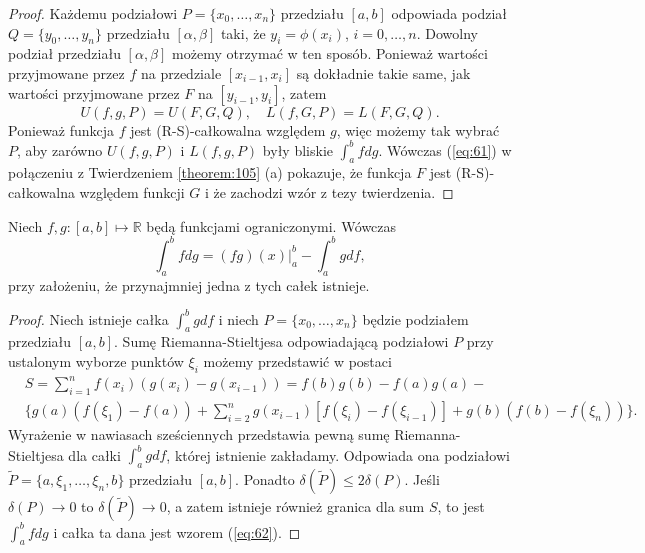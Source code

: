 \documentclass[leqno]{article}
\begin{document}
\begin{justify}
\begin{proof}
    Każdemu podziałowi $P = \{x_0, \ldots, x_n \}$ przedziału $[a,b]$ odpowiada podział 
    $Q = \{y_0, \ldots, y_n \}$ przedziału $[\alpha, \beta]$ taki, że $y_i = \phi(x_i)$, $i = 0, \ldots, n$.
    Dowolny podział przedziału $[\alpha, \beta]$ możemy otrzymać w ten sposób. Ponieważ wartości przyjmowane przez $f$ na przedziale $[x_{i-1}, x_i]$ są dokładnie takie same,
    jak wartości przyjmowane przez $F$ na $[y_{i-1}, y_i]$, zatem
    \begin{equation}\label{eq:61}
        U(f, g, P) = U(F, G, Q), \quad L(f, G, P) = L(F, G, Q).
    \end{equation}
    Ponieważ funkcja $f$ jest (R-S)-całkowalna względem $g$, więc możemy tak wybrać $P$, aby
    zarówno $U(f, g, P)$ i $L(f, g, P)$ były bliskie $\int_{a}^{b}fdg$. Wówczas (\ref{eq:61}) w
    połączeniu z Twierdzeniem \ref{theorem:105} (a) pokazuje, że funkcja $F$ jest (R-S)-całkowalna
    względem funkcji $G$ i że zachodzi wzór z tezy twierdzenia.
\end{proof}

\begin{theorem}
{
    Niech $f, g : [a,b] \mapsto \mathbb{R}$ będą funkcjami ograniczonymi. Wówczas 
    \begin{equation}\label{eq:62}
        \int_{a}^{b}fdg = (fg)(x) \big|_a^b - \int_{a}^{b}gdf,
    \end{equation}
    przy założeniu, że przynajmniej jedna z tych całek istnieje.
}
\end{theorem}

\begin{proof}
    Niech istnieje całka $\int_{a}^{b}gdf$ i niech $P = \{x_0, \ldots, x_n\}$ będzie podziałem przedziału $[a,b]$.
    Sumę Riemanna-Stieltjesa odpowiadającą podziałowi $P$ przy ustalonym wyborze punktów $\xi_i$ możemy przedstawić w postaci
    \begin{align*}
        &S = \sum_{i=1}^{n}f(x_i)(g(x_i) - g(x_{i-1})) = f(b)g(b) - f(a)g(a) - \\
        &\Bigg\{ g(a)(f(\xi_1) - f(a)) + \sum_{i=2}^{n}g(x_{i-1})[f(\xi_i) - f(\xi_{i-1})] + g(b)(f(b) - f(\xi_n))   \Bigg\}.
    \end{align*}
    Wyrażenie w nawiasach sześciennych przedstawia pewną sumę Riemanna-Stieltjesa dla całki
    $\int_{a}^{b}gdf$, której istnienie zakładamy. Odpowiada ona podziałowi $\tilde{P} = \{a, \xi_1, \ldots, \xi_n, b\}$
    przedziału $[a,b]$. Ponadto $\delta(\tilde{P}) \leqslant 2\delta(P)$. Jeśli $\delta(P) \to 0$ to $\delta(\tilde{P}) \to 0$, a zatem
    istnieje również granica dla sum $S$, to jest $\int_{a}^{b}fdg$ i całka ta dana jest wzorem (\ref{eq:62}).
\end{proof}


\end{justify}
\end{document}
